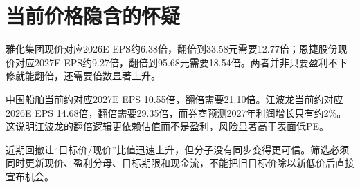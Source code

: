 \section{当前价格隐含的怀疑}

雅化集团现价对应2026E EPS约6.38倍，翻倍到33.58元需要12.77倍；恩捷股份现价对应2027E EPS约9.27倍，翻倍到95.68元需要18.54倍。两者并非只要盈利不下修就能翻倍，还需要倍数显著上升。

中国船舶当前约对应2027E EPS 10.55倍，翻倍需要21.10倍。江波龙当前约对应2026E EPS 14.68倍，翻倍需要29.35倍，而券商预测2027年利润增长只有约2\%。这说明江波龙的翻倍逻辑更依赖估值而不是盈利，风险显著高于表面低PE。

\begin{keyinsight}[投资含义]
近期回撤让“目标价/现价”比值迅速上升，但分子没有同步变得更可信。筛选必须同时更新现价、盈利分母、目标期限和现金流，不能把旧目标价除以新低价后直接宣布机会。
\end{keyinsight}

\clearpage

